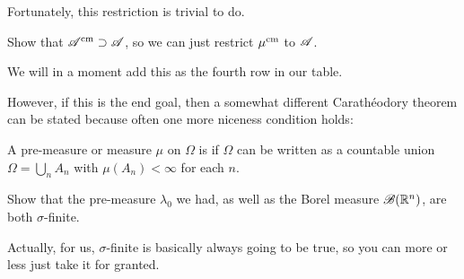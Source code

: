 Fortunately, this restriction is trivial to do.
\begin{ques}
	Show that $\mathscr A^\text{cm} \supset \mathscr A$,
	so we can just restrict $\mu^\text{cm}$ to $\mathscr A$.
\end{ques}
We will in a moment add this as the fourth row in our table.

However, if this is the end goal,
then a somewhat different Carath\'{e}odory theorem
can be stated because often one more niceness condition holds:
\begin{definition}
	A pre-measure or measure $\mu$ on $\Omega$ is 
	if $\Omega$ can be written as a countable union $\Omega = \bigcup_n A_n$
	with $\mu(A_n) < \infty$ for each $n$.
\end{definition}
\begin{ques}
	Show that the pre-measure $\lambda_0$ we had,
	as well as the Borel measure $\mathscr B(\mathbb R^n)$,
	are both $\sigma$-finite.
\end{ques}
Actually, for us, $\sigma$-finite is basically always going to be true,
so you can more or less just take it for granted.

